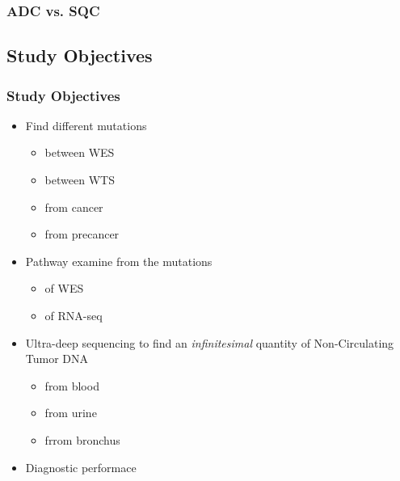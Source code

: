 \documentclass{beamer}
\begin{document}
    \begin{frame}
        \frametitle{ADC vs. SQC}
    \end{frame}

    \subsection{Study Objectives}
    \begin{frame}
        \frametitle{Study Objectives}

        \begin{itemize}
            \item Find different mutations
            \begin{itemize}
                \item between WES
                \item between WTS
            \end{itemize}
            \begin{itemize}
                \item from cancer
                \item from precancer
            \end{itemize}

            \item Pathway examine from the mutations
            \begin{itemize}
                \item of WES
                \item of RNA-seq
            \end{itemize}

            \item Ultra-deep sequencing to find an \textit{infinitesimal} quantity of Non-Circulating Tumor DNA
            \begin{itemize}
                \item from blood
                \item from urine
                \item frrom bronchus
            \end{itemize}

            \item Diagnostic performace
        \end{itemize}
    \end{frame}
\end{document}
